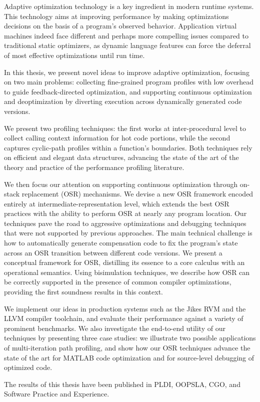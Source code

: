 Adaptive optimization technology is a key ingredient in modern runtime systems. This technology aims at improving performance by making optimizations decisions on the basis of a program's observed behavior. Application virtual machines indeed face different and perhaps more compelling issues compared to traditional static optimizers, as dynamic language features can force the deferral of most effective optimizations until run time.

In this thesis, we present novel ideas to improve adaptive optimization, focusing on two main problems: collecting fine-grained program profiles with low overhead to guide feedback-directed optimization, and supporting continuous optimization and deoptimization by diverting execution across dynamically generated code versions.

We present two profiling techniques: the first works at inter-procedural level to collect calling context information for hot code portions, while the second captures cyclic-path profiles within a function's boundaries. Both techniques rely on efficient and elegant data structures, advancing the state of the art of the theory and practice of the performance profiling literature.

We then focus our attention on supporting continuous optimization through on-stack replacement (OSR) mechanisms. We devise a new OSR framework encoded entirely at intermediate-representation level, which extends the best OSR practices with the ability to perform OSR at nearly any program location. Our techniques pave the road to aggressive optimizations and debugging techniques that were not supported by previous approaches. The main technical challenge is how to automatically generate compensation code to fix the program's state across an OSR transition between different code versions. We present a conceptual framework for OSR, distilling its essence to a core calculus with an operational semantics. Using bisimulation techniques, we describe how OSR can be correctly supported in the presence of common compiler optimizations, providing the first soundness results in this context.

We implement our ideas in production systems such as the Jikes RVM and the LLVM compiler toolchain, and evaluate their performance against a variety of prominent benchmarks. We also investigate the end-to-end utility of our techniques by presenting three case studies: we illustrate two possible applications of multi-iteration path profiling, and show how our OSR techniques advance the state of the art for MATLAB code optimization and for source-level debugging of optimized code.

The results of this thesis have been published in PLDI, OOPSLA, CGO, and Software Practice and Experience.